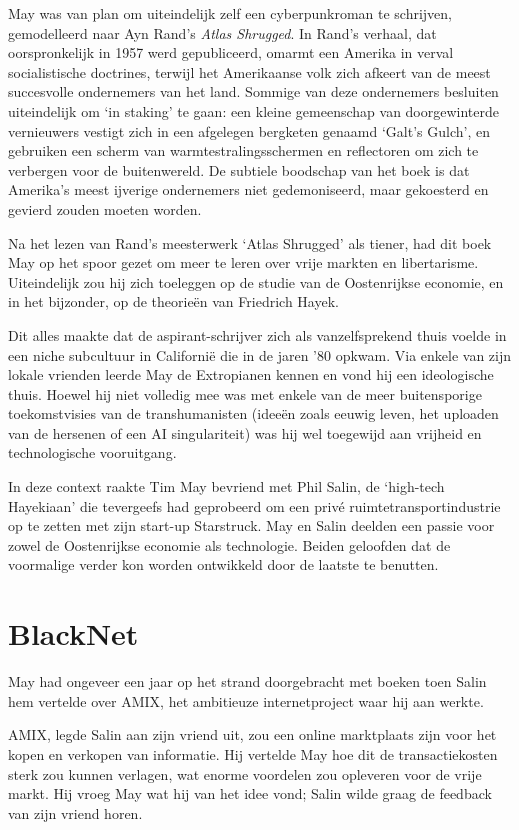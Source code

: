 \documentclass[smalldemyvopaper,11pt,twoside,onecolumn,openright,extrafontsizes,hidelinks]{memoir}
\begin{document}
May was van plan om uiteindelijk zelf een cyberpunkroman te schrijven,
gemodelleerd naar Ayn Rand's \emph{Atlas Shrugged}. In Rand's verhaal,
dat oorspronkelijk in 1957 werd gepubliceerd, omarmt een Amerika in
verval socialistische doctrines, terwijl het Amerikaanse volk zich
afkeert van de meest succesvolle ondernemers van het land. Sommige van
deze ondernemers besluiten uiteindelijk om `in staking' te gaan: een
kleine gemeenschap van doorgewinterde vernieuwers vestigt zich in een
afgelegen bergketen genaamd `Galt's Gulch', en gebruiken een scherm van
warmtestralingsschermen en reflectoren om zich te verbergen voor de
buitenwereld. De subtiele boodschap van het boek is dat Amerika's meest
ijverige ondernemers niet gedemoniseerd, maar gekoesterd en gevierd
zouden moeten worden.

Na het lezen van Rand's meesterwerk `Atlas Shrugged' als tiener, had dit
boek May op het spoor gezet om meer te leren over vrije markten en
libertarisme. Uiteindelijk zou hij zich toeleggen op de studie van de
Oostenrijkse economie, en in het bijzonder, op de theorieën van
Friedrich Hayek.

Dit alles maakte dat de aspirant-schrijver zich als vanzelfsprekend
thuis voelde in een niche subcultuur in Californië die in de jaren '80
opkwam. Via enkele van zijn lokale vrienden leerde May de Extropianen
kennen en vond hij een ideologische thuis. Hoewel hij niet volledig mee
was met enkele van de meer buitensporige toekomstvisies van de
transhumanisten (ideeën zoals eeuwig leven, het uploaden van de hersenen
of een AI singulariteit) was hij wel toegewijd aan vrijheid en
technologische vooruitgang.

In deze context raakte Tim May bevriend met Phil Salin, de `high-tech
Hayekiaan' die tevergeefs had geprobeerd om een privé
ruimtetransportindustrie op te zetten met zijn start-up Starstruck. May
en Salin deelden een passie voor zowel de Oostenrijkse economie als
technologie. Beiden geloofden dat de voormalige verder kon worden
ontwikkeld door de laatste te benutten.

\section{BlackNet}\label{blacknet}

May had ongeveer een jaar op het strand doorgebracht met boeken toen
Salin hem vertelde over AMIX, het ambitieuze internetproject waar hij
aan werkte.

AMIX, legde Salin aan zijn vriend uit, zou een online marktplaats zijn
voor het kopen en verkopen van informatie. Hij vertelde May hoe dit de
transactiekosten sterk zou kunnen verlagen, wat enorme voordelen zou
opleveren voor de vrije markt. Hij vroeg May wat hij van het idee vond;
Salin wilde graag de feedback van zijn vriend horen.
\end{document}
